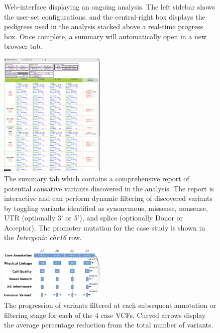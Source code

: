 \documentclass[twocolumn]{bmcart}%
\begin{document}
\begin{backmatter}
\begin{figure}[h!]
\caption{\csentence{}Web-interface displaying an ongoing analysis. The left sidebar shows the user-set configurations, and the central-right box displays the pedigrees used in the analysis stacked above a real-time progress box. Once complete, a summary will automatically open in a new browser tab.\label{fig2}}
\end{figure}
\begin{figure}[h!]
  \centerline{\includegraphics[width=0.45\textwidth]{fig3.png}}
\caption{\csentence{}The summary tab which contains a comprehensive report of potential causative variants discovered in the analysis. The report is interactive and can perform dynamic filtering of discovered variants by toggling variants identified as synonymous, missense, nonsense, UTR (optionally 3' or 5'), and splice (optionally Donor or Acceptor). The promoter mutation for the case study is shown in the \textit{Intergenic chr16} row.\label{fig3}}
\end{figure}
\begin{figure}[h!]
  \centerline{\includegraphics[width=0.45\textwidth]{fig4.png}}
\caption{\csentence{}The progression of variants filtered at each subsequent annotation or filtering stage for each of the 4 case VCFs. Curved arrows display the average percentage reduction from the total number of variants.\label{fig4}}
\end{figure}




\end{backmatter}
\end{document}
